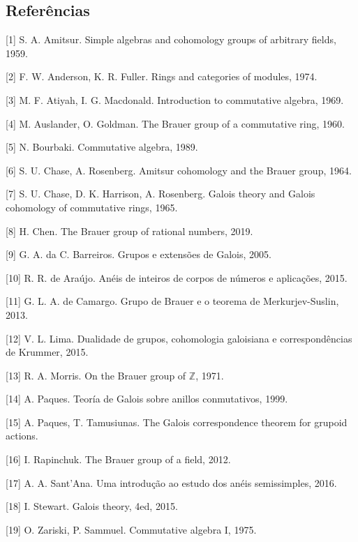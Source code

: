 \documentclass{beamer}
\begin{document}
\subsection{Referências}
\begin{frame}

    [1] S. A. Amitsur. Simple algebras and cohomology groups of arbitrary fields, 1959.
    
    [2] F. W. Anderson, K. R. Fuller. Rings and categories of modules, 1974.
    
    [3] M. F. Atiyah, I. G. Macdonald. Introduction to commutative algebra, 1969.
    
    [4] M. Auslander, O. Goldman. The Brauer group of a commutative ring, 1960.
    
    [5] N. Bourbaki. Commutative algebra, 1989.
    
    [6] S. U. Chase, A. Rosenberg. Amitsur cohomology and the Brauer group, 1964.
    
    [7] S. U. Chase, D. K. Harrison, A. Rosenberg. Galois theory and Galois cohomology of commutative rings, 1965.
    
    [8] H. Chen. The Brauer group of rational numbers, 2019.
    
    [9] G. A. da C. Barreiros. Grupos e extensões de Galois, 2005.
\end{frame}

\begin{frame}

    [10] R. R. de Araújo. Anéis de inteiros de corpos de números e aplicações, 2015.
    
    [11] G. L. A. de Camargo. Grupo de Brauer e o teorema de Merkurjev-Suslin, 2013.
    
    [12] V. L. Lima. Dualidade de grupos, cohomologia galoisiana e correspondências de Krummer, 2015.
    
    [13] R. A. Morris. On the Brauer group of $\mathbb{Z}$, 1971.
    
    [14] A. Paques. Teoría de Galois sobre anillos conmutativos, 1999.
    
    [15] A. Paques, T. Tamusiunas. The Galois correspondence theorem for grupoid actions.
    
    [16] I. Rapinchuk. The Brauer group of a field, 2012.
    
    [17] A. A. Sant'Ana. Uma introdução ao estudo dos anéis semissimples, 2016.
    
    [18] I. Stewart. Galois theory, 4ed, 2015.
    
    [19] O. Zariski, P. Sammuel. Commutative algebra I, 1975.
\end{frame}
\end{document}
